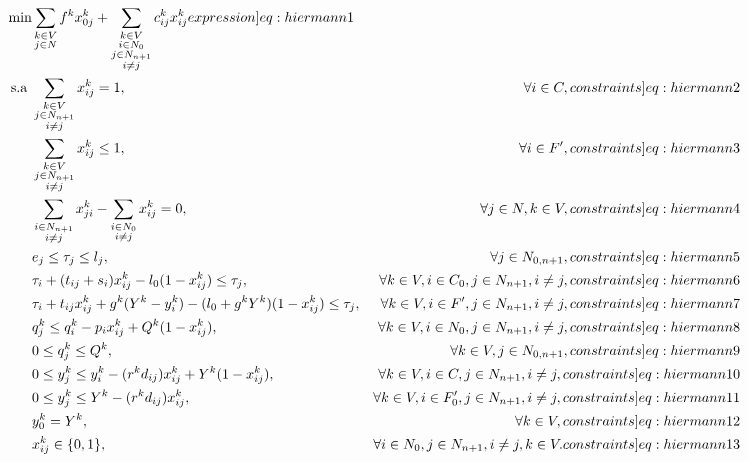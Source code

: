 \begin{footnotesize}
\begin{align}
    \min& \sum_{\substack{k \in V\\j \in N}}f^kx_{0j}^k + \sum_{\substack{k \in V\\i \in N_0\\j \in N_{n+1}\\i \neq j}}c_{ij}^kx_{ij}^k\label[expression]{eq:hiermann1}\\
    \text{s.a }& \sum_{\substack{k \in V\\j \in N_{n+1}\\i \neq j}}x_{ij}^k = 1, & \forall i \in C, \label[constraints]{eq:hiermann2}\\
    &\sum_{\substack{k \in V\\j \in N_{n+1}\\i \neq j}}x_{ij}^k \leq 1, & \forall i \in F', \label[constraints]{eq:hiermann3}\\
    &\sum_{\substack{i \in N_{n+1}\\ i \neq j}}x_{ji}^k - \sum_{\substack{i \in N_0\\ i \neq j}}x_{ij}^k = 0, & \forall j \in N, k \in V, \label[constraints]{eq:hiermann4}\\
    &e_j \leq \tau_j \leq l_j, & \forall j \in N_{0,n+1}, \label[constraints]{eq:hiermann5}\\
    &\tau_i + (t_{ij} + s_i)x_{ij}^k - l_0(1 - x_{ij}^k) \leq \tau_j, & \forall k \in V, i \in C_0, j \in N_{n+1}, i \neq j, \label[constraints]{eq:hiermann6}\\
    &\tau_i + t_{ij}x_{ij}^k + g^k(Y^k - y_i^k) - (l_0 + g^kY^k)(1 - x_{ij}^k) \leq \tau_j, & \forall k \in V, i \in F', j \in N_{n+1}, i \neq j, \label[constraints]{eq:hiermann7}\\
    &q_j^k \leq q_i^k - p_ix_{ij}^k + Q^k(1 - x_{ij}^k), & \forall k \in V, i \in N_0, j \in N_{n+1}, i \neq j, \label[constraints]{eq:hiermann8}\\
    &0 \leq q_j^k \leq Q^k, & \forall k \in V, j \in N_{0, n+1}, \label[constraints]{eq:hiermann9}\\
    &0 \leq y_j^k \leq y_i^k - (r^kd_{ij})x_{ij}^k + Y^k(1 - x_{ij}^k), & \forall k \in V, i \in C, j \in N_{n+1}, i \neq j, \label[constraints]{eq:hiermann10}\\
    &0 \leq y_j^k \leq Y^k - (r^kd_{ij})x_{ij}^k, & \forall k \in V, i \in F_0', j \in N_{n+1}, i \neq j, \label[constraints]{eq:hiermann11}\\
    &y_0^k = Y^k, & \forall k \in V, \label[constraints]{eq:hiermann12}\\
    &x_{ij}^k \in \{0,1\}, & \forall i \in N_0, j \in N_{n+1}, i \neq j, k \in V. \label[constraints]{eq:hiermann13}
\end{align}
\end{footnotesize}

